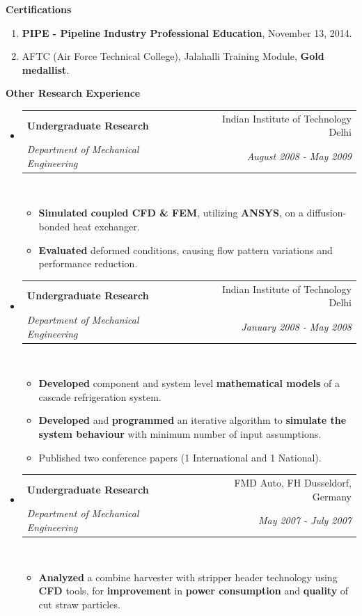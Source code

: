 \documentclass[letterpaper,11pt]{article}
\makeatletter
\newcommand{\resitem}[1]{\item #1 \vspace{-2pt}}
\newcommand{\resheading}[1]{{\large \colorbox{mygrey}{\begin{minipage}{\textwidth}{\textbf{#1 \vphantom{p\^{E}}}}\end{minipage}}}}
\newcommand{\ressubheading}[4]{
\begin{tabular*}{7.0in}{l@{\extracolsep{\fill}}r}
		\textbf{#1} & #2 \\
		\textit{#3} & \textit{#4} \\
\end{tabular*}\vspace{-6pt}}
\makeatother
\begin{document}
\resheading{Certifications}
\begin{enumerate}
	\resitem{{\small \textbf{PIPE - Pipeline Industry Professional Education}, November 13, 2014.}}
	\resitem{{\small AFTC (Air Force Technical College), Jalahalli Training Module, \textbf{Gold medallist}.}}
\end{enumerate}

\resheading{Other Research Experience}
\begin{itemize}
	\item
	      \ressubheading{Undergraduate Research}{Indian Institute of Technology Delhi}{Department of Mechanical Engineering}{August 2008 - May 2009}\\
	      \begin{itemize}
		      \resitem{{\small \textbf{Simulated} \textbf{coupled CFD \& FEM}, utilizing \textbf{ANSYS}, on a diffusion-bonded heat exchanger.}}
		      \resitem{{\small \textbf{Evaluated} deformed conditions, causing flow pattern variations and performance reduction.}}
	      \end{itemize}
	\item
	      \ressubheading{Undergraduate Research}{Indian Institute of Technology Delhi}{Department of Mechanical Engineering}{January 2008 - May 2008}\\
	      \begin{itemize}
		      \resitem{{\small \textbf{Developed} component and system level \textbf{mathematical models} of a cascade refrigeration system.}}
		      \resitem{{\small \textbf{Developed} and \textbf{programmed} an iterative algorithm to \textbf{simulate the system behaviour} with minimum number of input assumptions.}}
		      \resitem{{\small Published two conference papers (1 International and 1 National).}}
	      \end{itemize}
	\item
	      \ressubheading{Undergraduate Research}{FMD Auto, FH Dusseldorf, Germany}{Department of Mechanical Engineering}{May 2007 - July 2007}\\
	      \begin{itemize}
		      \resitem{{\small \textbf{Analyzed} a combine harvester with stripper header technology using \textbf{CFD} tools, for \textbf{improvement} in \textbf{power consumption} and \textbf{quality} of cut straw particles.}}
	      \end{itemize}
\end{itemize}
\end{document}
